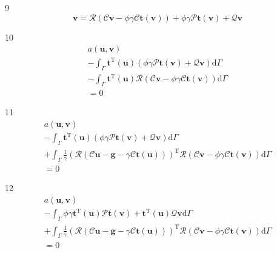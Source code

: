 \documentclass[a4paper,12pt]{article}
\begin{document}
9
\begin{equation}
\mathbf{v} =
\mathcal{R}(\mathcal{C}\mathbf{v}-\phi\gamma\mathcal{C}\mathbf{t}(\mathbf{v}))
+\phi\gamma\mathcal{P}\mathbf{t}(\mathbf{v}) + \mathcal{Q}\mathbf{v}
\end{equation}

10
\begin{equation}
\begin{split}
a(\mathbf{u},\mathbf{v})
\\-
\int_\Gamma
\mathbf{t}^{\textrm{T}}(\mathbf{u})
(
\phi\gamma\mathcal{P}\mathbf{t}(\mathbf{v})
+
\mathcal{Q}\mathbf{v}
)
\textrm{d}\Gamma
\\-
\int_\Gamma
\mathbf{t}^\textrm{T}(\mathbf{u})
\mathcal{R}(\mathcal{C}\mathbf{v}-\phi\gamma\mathcal{C}\mathbf{t}(\mathbf{v}))
\textrm{d}\Gamma
\\=
0
\end{split}
\end{equation}

11
\begin{equation}
\begin{split}
a(\mathbf{u},\mathbf{v})
\\-
\int_\Gamma
\mathbf{t}^{\textrm{T}}(\mathbf{u})
(\phi\gamma\mathcal{P}\mathbf{t}(\mathbf{v})+\mathcal{Q}\mathbf{v})
\textrm{d}\Gamma
\\+
\int_\Gamma
\frac{1}{\gamma}
(
\mathcal{R}(\mathcal{C}\mathbf{u}-\mathbf{g}-\gamma\mathcal{C}\mathbf{t}(\mathbf{u}))
)^\textrm{T}
\mathcal{R}(\mathcal{C}\mathbf{v}-\phi\gamma\mathcal{C}\mathbf{t}(\mathbf{v}))
\textrm{d}\Gamma
\\=
0
\end{split}
\end{equation}

12
\begin{equation}
\begin{split}
a(\mathbf{u},\mathbf{v})
\\-
\int_\Gamma
\phi\gamma\mathbf{t}^{\textrm{T}}(\mathbf{u})\mathcal{P}\mathbf{t}(\mathbf{v})
+
\mathbf{t}^\textrm{T}(\mathbf{u})\mathcal{Q}\mathbf{v}
\textrm{d}\Gamma
\\+
\int_\Gamma
\frac{1}{\gamma}
(
\mathcal{R}(\mathcal{C}\mathbf{u}-\mathbf{g}-\gamma\mathcal{C}\mathbf{t}(\mathbf{u}))
)^\textrm{T}
\mathcal{R}(\mathcal{C}\mathbf{v}-\phi\gamma\mathcal{C}\mathbf{t}(\mathbf{v}))
\textrm{d}\Gamma
\\=
0
\end{split}
\end{equation}
\end{document}

